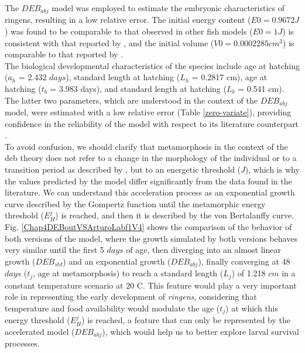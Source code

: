 The $DEB_{abj}$ model was employed to estimate the embryonic characteristics of \gls{ringens}, resulting in a low relative error. The initial energy content ($E0 = 0.9672 J$) was found to be comparable to that observed in other fish models ($E0 = 1 J$) is consistent with that reported by \cite{FlorLett2023}, and the initial volume ($V0 = 0.0002285 cm^3$) is comparable to that reported by \cite{RiouOfel2021}.\\

The biological developmental characteristics of the species include age at hatching ($a_{h}$ = 2.432 $days$), standard length at hatching ($L_{h}$ = 0.2817 cm), age at hatching ($t_b$ = 3.983 days), and standard length at hatching ($L_{b}$ = 0.541 cm). The latter two parameters, which are understood in the context of the $DEB_{abj}$ model, were estimated with a low relative error (Table \ref{zero-variate}), providing confidence in the reliability of the model with respect to its literature counterpart \citep{WareMend1981,RiouOfel2021}.\\

To avoid confusion, we should clarify that metamorphosis in the context of the \acrshort{deb} theory does not refer to a change in the morphology of the individual or to a transition period as described by \cite{MoreClar2011}, but to an energetic threshold ($J$), which is why the values predicted by the model differ significantly from the data found in the literature. We can understand this acceleration process as an exponential growth curve described by the Gompertz function until the metamorphic energy threshold ($E_{H}^j$) is reached, and then it is described by the von Bertalanffy curve. Fig. \ref{Chap4DEBoutVSArturoLabf1V4} shows the comparison of the behavior of both versions of the model, where the growth simulated by both versions behaves very similar until the first 5 $days$ of age, then diverging into an almost linear growth ($DEB_{std}$) and an exponential growth ($DEB_{abj}$), finally converging at 48 $days$ ($t_{j}$, age at metamorphosis) to reach a standard length ($L_{j}$) of 1.218 $cm$ in a constant temperature scenario at 20 \textdegree C. This feature would play a very important role in representing the early development of \textit{\gls{ringens}}, considering that temperature and food availability would modulate the age ($t_{j}$) at which this energy threshold ($E_{H}^j$) is reached, a feature that can only be represented by the accelerated model ($DEB_{abj}$), which would help us to better explore larval survival processes.\\

